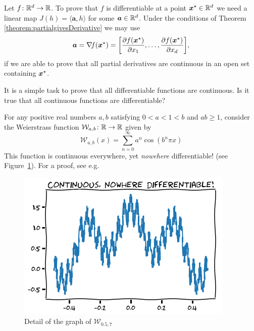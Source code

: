 \begin{example}\label{example:gradient}
Let $f\colon \mathbb{R}^d \to \mathbb{R}$.  To prove that $f$ is differentiable at a point $\boldsymbol{x}^{\star} \in \mathbb{R}^d$ we need a linear map $J(h) = \langle \boldsymbol{a}, h \rangle$ for some $\boldsymbol{a} \in \mathbb{R}^d$.  Under the conditions of Theorem \ref{theorem:partialgivesDerivative} we may use
\begin{equation*}
\boldsymbol{a} = \mathop{\nabla\! {f}}(\boldsymbol{x}^{\star})= \bigg[ \frac{\partial f (\boldsymbol{x}^{\star})}{\partial x_1}, \dotsc, \frac{\partial f (\boldsymbol{x}^{\star})}{\partial x_d} \bigg],
\end{equation*}
if we are able to prove that all partial derivatives are continuous in an open set containing $\boldsymbol{x}^{\star}$.
\end{example}

\separator 

It is a simple task to prove that all differentiable functions are continuous.  Is it true that all continuous functions are differentiable?

\begin{example}\label{example:WeierstrassFunction}
For any positive real numbers $a, b$ satisfying $0<a<1<b$ and $ab \geq 1$, consider the Weierstrass function $\mathcal{W}_{a,b} \colon \mathbb{R} \to \mathbb{R}$ given by 
\begin{equation*}
\mathcal{W}_{a,b}(x) = \sum_{n=0}^\infty a^n \cos(b^n \pi x)
\end{equation*}
This function is continuous everywhere, yet \emph{nowehere} differentiable! (see Figure~\ref{figure:WeierstrassFunction}). For a proof, see e.g.~\cite{hardy1916weierstrass}
\begin{figure}[ht!]
\includegraphics[width=0.6\linewidth]{images/weierstrass.png}
\caption{Detail of the graph of $\mathcal{W}_{0.5, 7}$}
\label{figure:WeierstrassFunction}
\end{figure}
\end{example}


